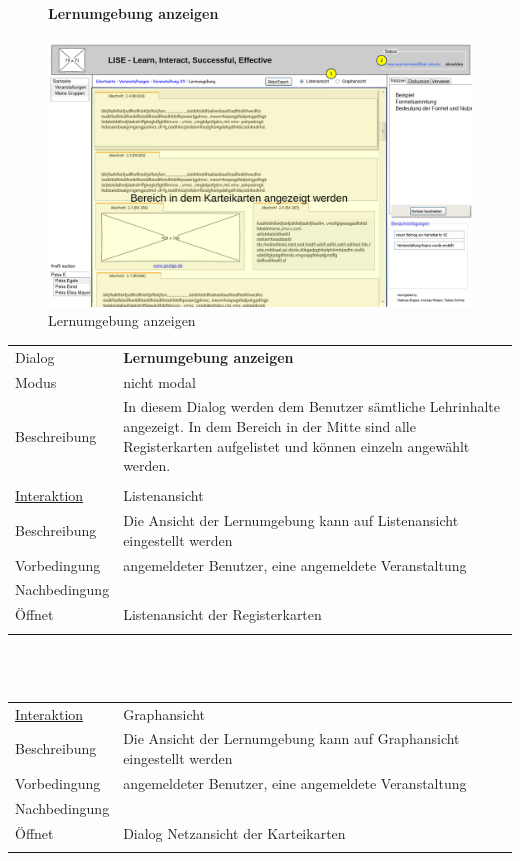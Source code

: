 \documentclass[12pt,a4paper]{article}
\begin{document}
{\begin{figure}[H]
	\centering
	\paragraph{Lernumgebung anzeigen}
	\includegraphics[width=\textwidth]{Bilder/Mockups/GUI/KarteikartenAnzeigen[Benutzer].png}
	\caption{Lernumgebung anzeigen}
	\label{GuiLernumgebungAnzeigen}
\end{figure}
\begin{tabular}{l p{12cm}}
Dialog 	 			& \textbf{Lernumgebung anzeigen} \\ 
Modus 				& nicht modal\\ 
Beschreibung   	 	& In diesem Dialog werden dem Benutzer sämtliche Lehrinhalte angezeigt. In dem Bereich in der Mitte sind alle Registerkarten aufgelistet und können einzeln angewählt werden.\\\\ 

\underline{Interaktion}  	 & Listenansicht\\ 
Beschreibung   	 			 & Die Ansicht der Lernumgebung kann auf  Listenansicht eingestellt werden\\
Vorbedingung				 & angemeldeter Benutzer, eine angemeldete Veranstaltung \\
Nachbedingung				 & \\
Öffnet						 & \glqq Listenansicht der Registerkarten\grqq \\\\
\end{tabular} \\\\
\begin{tabular}{l p{12cm}}
\underline{Interaktion}  	 & Graphansicht\\ 
Beschreibung   				 & Die Ansicht der Lernumgebung kann auf  Graphansicht eingestellt werden  \\
Vorbedingung				 & angemeldeter Benutzer, eine angemeldete Veranstaltung \\
Nachbedingung				 & \\
Öffnet			 			 & \glqq Dialog Netzansicht der Karteikarten\grqq \\\\


\end{tabular}}
\end{document}
